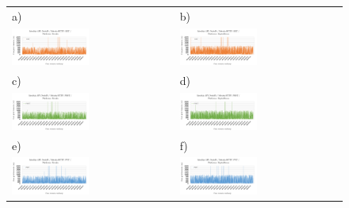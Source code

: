 \begin{figure}[htb]
  \centering
	\begin{tabular}{@{}ll@{}}
    a) & b) \\
    \includegraphics[width=0.49\textwidth]{rys05/nodejs-get-heroku.pdf} & \includegraphics[width=0.49\textwidth]{rys05/nodejs-get-digitalocean.pdf} \\
    c) & d) \\
    \includegraphics[width=0.49\textwidth]{rys05/nodejs-post-heroku.pdf} & \includegraphics[width=0.49\textwidth]{rys05/nodejs-post-digitalocean.pdf} \\
    e) & f) \\
    \includegraphics[width=0.49\textwidth]{rys05/nodejs-put-heroku.pdf} & \includegraphics[width=0.49\textwidth]{rys05/nodejs-put-digitalocean.pdf} \\

\end{tabular}
\end{figure}
